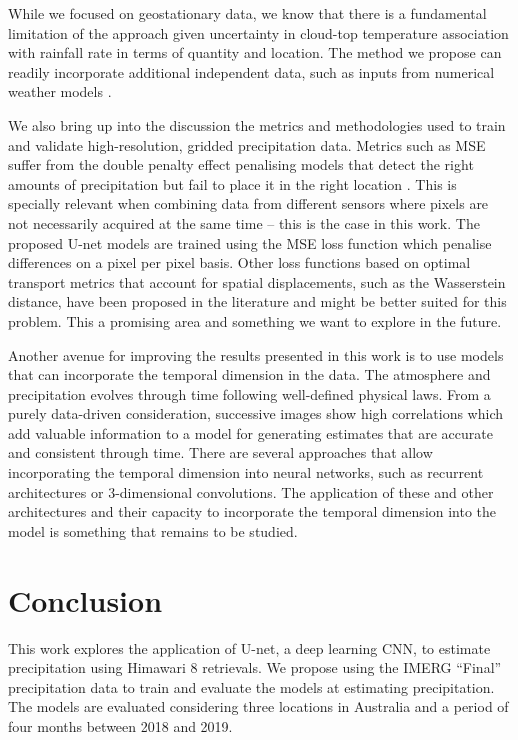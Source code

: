 \documentclass[3p,times]{elsarticle}
\begin{document}
While we focused on geostationary data, we know that there is a fundamental limitation of the approach given uncertainty in cloud-top temperature association with rainfall rate in terms of quantity and location. The method we propose can readily incorporate additional independent data, such as inputs from numerical weather models \citep{larraondo2019data}.

We also bring up into the discussion the metrics and methodologies used to train and validate high-resolution, gridded precipitation data. Metrics such as MSE suffer from the double penalty effect penalising models that detect the right amounts of precipitation but fail to place it in the right location \citep{anthes1983regional,mass2002does}. This is specially relevant when combining data from different sensors where pixels are not necessarily acquired at the same time -- this is the case in this work. The proposed U-net models are trained using the MSE loss function which penalise differences on a pixel per pixel basis. Other loss functions based on optimal transport metrics that account for spatial displacements, such as the Wasserstein distance, have been proposed in the literature \citep{farchi2016using} and might be better suited for this problem. This a promising area and something we want to explore in the future.

Another avenue for improving the results presented in this work is to use models that can incorporate the temporal dimension in the data. The atmosphere and precipitation evolves through time following well-defined physical laws. From a purely data-driven consideration, successive images show high correlations which add valuable information to a model for generating estimates that are accurate and consistent through time. There are several approaches that allow incorporating the temporal dimension into neural networks, such as recurrent architectures or 3-dimensional convolutions. The application of these and other architectures and their capacity to incorporate the temporal dimension into the model is something that remains to be studied. 

\section{Conclusion}  %

This work explores the application of U-net, a deep learning CNN, to estimate precipitation using Himawari 8 retrievals. We propose using the IMERG ``Final'' precipitation data to train and evaluate the models at estimating precipitation. The models are evaluated considering three locations in Australia and a period of four months between 2018 and 2019.
\end{document}
